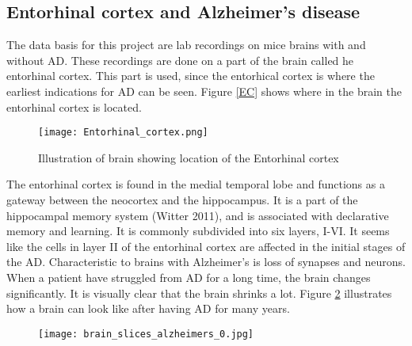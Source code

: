 \subsection{Entorhinal cortex and Alzheimer's disease}


The data basis for this project are lab recordings on mice brains with and without AD. These recordings are done on a part of the brain called he entorhinal cortex. This part is used, since the entorhical cortex is where the earliest indications for AD can be seen. Figure \ref{EC} shows where in the brain the entorhinal cortex is located. 


\begin{figure}[h]
    \caption{Illustration of brain showing location of the Entorhinal cortex}
    \label{EC}
    \centering
    \texttt{[image: Entorhinal\_cortex.png]}
    \label{brain}
\end{figure} 

The entorhinal cortex is found in the medial temporal lobe and functions as a gateway between the neocortex and the hippocampus. It is a part of the hippocampal memory system (Witter 2011), and is associated with declarative memory and learning. It is commonly subdivided into six layers, I-VI. It seems like the cells in layer II of the entorhinal cortex are affected in the initial stages of the AD. Characteristic to brains with Alzheimer's is loss of synapses and neurons. When a patient have struggled from AD for a long time, the brain changes significantly. It is visually clear that the brain shrinks a lot. Figure \ref{brain1} illustrates how a brain can look like after having AD for many years.


\begin{figure}[h]
\caption{}
    \label{brain1}
    \centering
    \texttt{[image: brain\_slices\_alzheimers\_0.jpg]}

\end{figure} 

